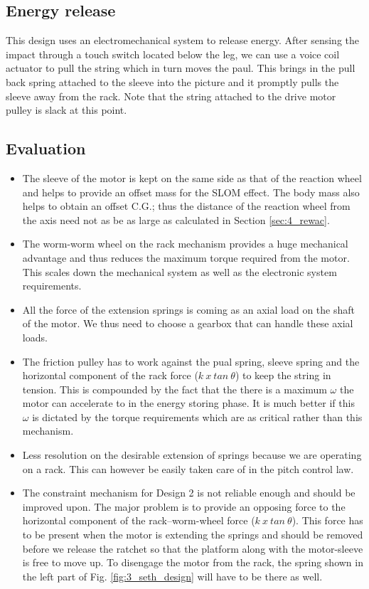 \subsection*{Energy release}
This design uses an electromechanical system to release energy. After sensing the impact through a touch switch located
below the leg, we can use a voice coil actuator to pull the string which in turn moves the paul. This brings in the pull
back spring attached to the sleeve into the picture and it promptly pulls the sleeve away from the rack. Note that the string attached 
to the drive motor pulley is slack at this point.

\subsection{Evaluation}
\begin{itemize}
\item
The sleeve of the motor is kept on the same side as that of the reaction wheel and helps to provide an offset mass for the SLOM effect. The body mass
also helps to obtain an offset C.G.; thus the distance of the reaction wheel from the axis need not as be
as large as calculated in Section \ref{sec:4_rewac}. 
\item
The worm-worm wheel on the rack mechanism provides a huge mechanical advantage and thus reduces the maximum torque required from
the motor. This scales down the mechanical system as well as the electronic system requirements.
\item
All the force of the extension springs is coming as an axial load on the shaft of the motor. We thus
need to choose a gearbox that can handle these axial loads.
\item
The friction pulley has to work against the pual spring, sleeve spring and the horizontal component of the rack force ($k\:x\:tan\:\theta$) to keep the string in tension. This is compounded by the fact that the there is a maximum $\omega$ the motor can
accelerate to in the energy storing phase. It is much better if this $\omega$ is dictated by the torque requirements which are as
critical rather than this mechanism.
\item
Less resolution on the desirable extension of springs because we are operating on a rack. This can however be easily taken care of
in the pitch control law.
\item
The constraint mechanism for Design 2 is not reliable enough and should be improved upon. The major problem is to provide an opposing 
force to the horizontal component of the rack--worm-wheel force ($k\:x\:tan\:\theta$). This force
has to be present when the motor is extending the springs and should be removed before we release the ratchet so that the platform
along with the motor-sleeve is free to move up. To disengage the motor from the rack, the spring shown in the left part of Fig. \ref {fig:3_seth_design} will have to be there as well.
\end{itemize}




